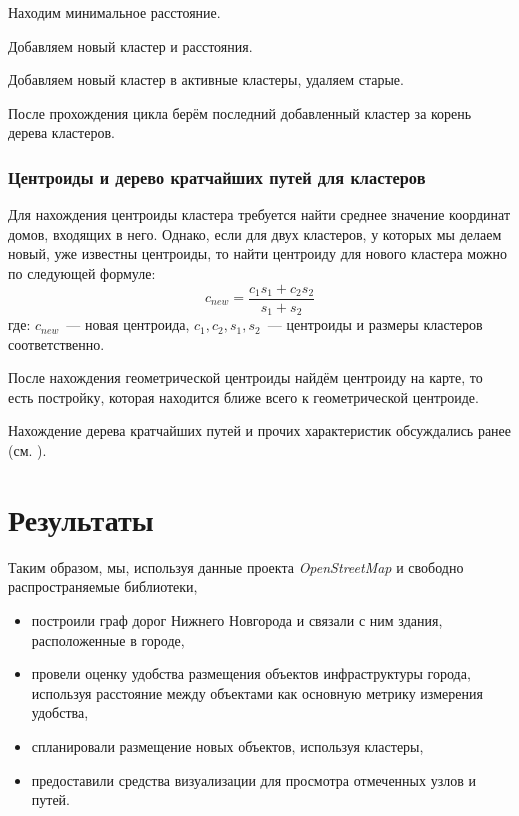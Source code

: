 \documentclass[11pt]{article}
\begin{document}
	Находим минимальное расстояние.
	
	
	
	Добавляем новый кластер и расстояния.
	
	

	Добавляем новый кластер в активные кластеры, удаляем старые.
	
	

	После прохождения цикла берём последний добавленный кластер за корень дерева кластеров.
	
	

	\subsubsection{Центроиды и дерево кратчайших путей для кластеров}

	Для нахождения центроиды кластера требуется найти среднее значение координат домов, входящих в него. 
	Однако, если для двух кластеров, у которых мы делаем новый, уже известны центроиды, то найти центроиду для нового кластера можно по следующей формуле:
	\[
		c_{new} = \frac{c_1 s_1 + c_2 s_2}{s_1 + s_2}
	\] 
	где: $c_{new}$~--- новая центроида, $c_1, c_2, s_1, s_2$~--- центроиды и размеры кластеров соответственно.

	После нахождения геометрической центроиды найдём центроиду на карте, то есть постройку, которая находится ближе всего к геометрической центроиде.

	

	Нахождение дерева кратчайших путей и прочих характеристик обсуждались ранее (см. ).

    \section{Результаты}\label{section:results}
    
    Таким образом, мы, используя данные проекта \textit{OpenStreetMap} и свободно распространяемые библиотеки,
	\begin{itemize}
	\item построили граф дорог Нижнего Новгорода и связали с ним здания, расположенные в городе,
	\item провели оценку удобства размещения объектов инфраструктуры города, используя расстояние между объектами как основную метрику измерения удобства,
	\item спланировали размещение новых объектов, используя кластеры,
	\item предоставили средства визуализации для просмотра отмеченных узлов и путей.
	\end{itemize}
	
\end{document}
